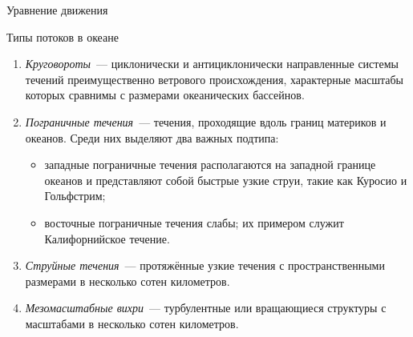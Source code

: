 \begin{chapter}{Уравнение движения}
\begin{section}{Типы потоков в океане}
\begin{enumerate}
\item
\emph{Круговороты}~--- циклонически и антициклонически
направленные системы течений преимущественно ветрового происхождения, 
характерные масштабы которых сравнимы с
размерами океанических бассейнов.
%

\item
\emph{Пограничные течения}~--- течения, проходящие 
вдоль границ материков и океанов. Среди них выделяют два важных подтипа: 
%
%
\begin{itemize}
 \item западные пограничные течения располагаются на западной
 границе океанов и представляют собой быстрые узкие струи, такие как
 Куросио и Гольфстрим;
%

 \item восточные пограничные течения слабы; их примером служит Калифорнийское
 течение.
%
\end{itemize}

\item
\emph{Струйные течения}~--- протяжённые узкие течения с
пространственными размерами в несколько сотен километров.
%

\item
\emph{Мезомасштабные вихри}~--- турбулентные или вращающиеся структуры
с масштабами в несколько сотен километров.
%
\end{enumerate}


\end{section}
\end{chapter}
